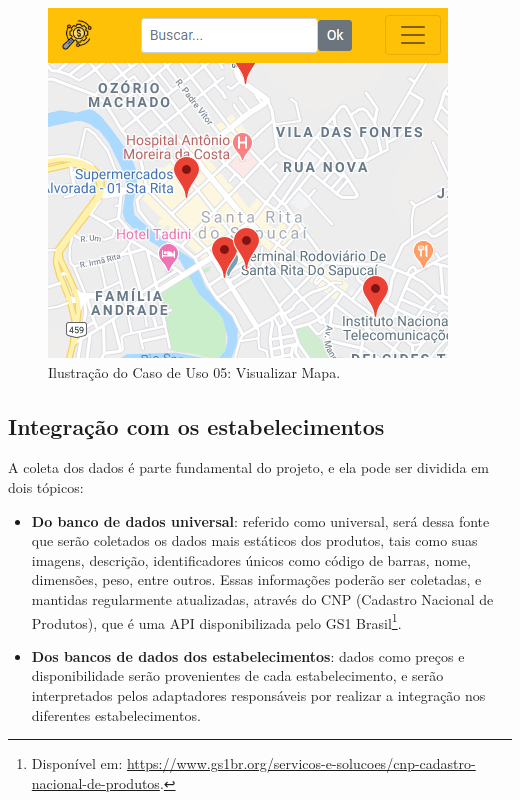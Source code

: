 \begin{figure}[H]
\centering
\includegraphics[width=\linewidth]{figuras/tela_mapa.png}
\caption{Ilustração do Caso de Uso 05: Visualizar Mapa.}
\label{fig:mapa}
\end{figure}

\subsection{Integração com os estabelecimentos}

A coleta dos dados é parte fundamental do projeto, e ela pode ser dividida em dois tópicos:
\begin{itemize}
    \item \textbf{Do banco de dados universal}: referido como universal, será dessa fonte que serão coletados os dados mais estáticos dos produtos, tais como suas imagens, descrição, identificadores únicos como código de barras, nome, dimensões, peso, entre outros. Essas informações poderão ser coletadas, e mantidas regularmente atualizadas, através do CNP (Cadastro Nacional de Produtos), que é uma API disponibilizada pelo GS1 Brasil\footnote{Disponível em: \url{https://www.gs1br.org/servicos-e-solucoes/cnp-cadastro-nacional-de-produtos}.}.
    \item \textbf{Dos bancos de dados dos estabelecimentos}: dados como preços e disponibilidade serão provenientes de cada estabelecimento, e serão interpretados pelos adaptadores responsáveis por realizar a integração nos diferentes estabelecimentos.
\end{itemize}

